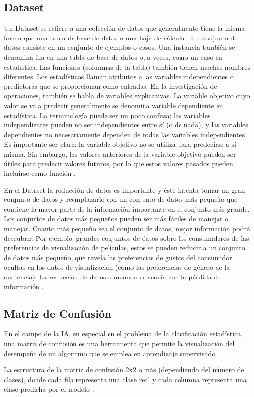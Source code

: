 \subsection{Dataset}
Un Dataset se refiere a una colección de datos que generalmente tiene la misma forma que una tabla de base de datos o una hoja de cálculo \cite{Astudillo2021}. Un conjunto de datos consiste en un conjunto de ejemplos o casos. Una instancia también se denomina fila en una tabla de base de datos o, a veces, como un caso en estadística. Las funciones (columnas de la tabla) también tienen muchos nombres diferentes. Los estadísticos llaman atributos a las variables independientes o predictoras que se proporcionan como entradas. En la investigación de operaciones, también se habla de variables explicativas. La variable objetivo cuyo valor se va a predecir generalmente se denomina variable dependiente en estadística. La terminología puede ser un poco confusa; las variables independientes pueden no ser independientes entre sí (o de nada), y las variables dependientes no necesariamente dependen de todas las variables independientes. Es importante ser claro: la variable objetivo no se utiliza para predecirse a sí misma. Sin embargo, los valores anteriores de la variable objetivo pueden ser útiles para predecir valores futuros, por lo que estos valores pasados pueden incluirse como función \cite{provost2013data}.\\
\par En el Dataset la reducción de datos es importante y éste intenta tomar un gran conjunto de datos y reemplazarlo con un conjunto de datos más pequeño que contiene la mayor parte de la información importante en el conjunto más grande. Los conjuntos de datos más pequeños pueden ser más fáciles de manejar o manejar. Cuanto más pequeño sea el conjunto de datos, mejor información podrá descubrir. Por ejemplo, grandes conjuntos de datos sobre los consumidores de las preferencias de visualización de películas, estos se pueden reducir a un conjunto de datos más pequeño, que revela las preferencias de gustos del consumidor ocultas en los datos de visualización (como las preferencias de género de la audiencia). La reducción de datos a menudo se asocia con la pérdida de información \cite{provost2013data}.\\

\doublespacing
\subsection{Matriz de Confusión}
\label{sec:mc}
En el campo de la IA, en especial en el problema de la clasificación estadística, una matriz de confusión es una herramienta que permite la visualización del desempeño de un algoritmo que se emplea en aprendizaje supervisado .
\par La estructura de la matriz de confusión 2x2 o más (dependiendo del número de clases), donde cada fila representa una clase real y cada columna representa una clase predicha por el modelo \cite{Harrington2012}:


